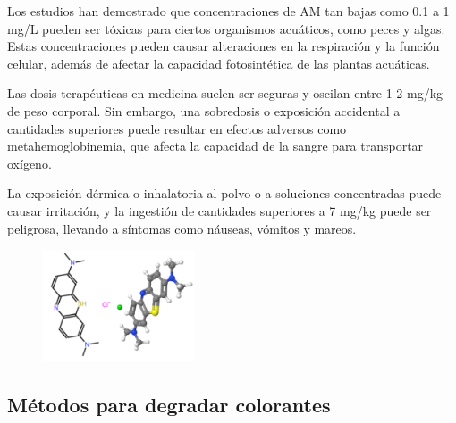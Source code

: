 \documentclass[12pt]{article}
\begin{document}
    Los estudios han demostrado que concentraciones de AM tan bajas como 0.1 a 1 mg/L pueden ser tóxicas para ciertos organismos acuáticos, como peces y algas. Estas concentraciones pueden causar alteraciones en la respiración y la función celular, además de afectar la capacidad fotosintética de las plantas acuáticas.\vspace{1em} %

     Las dosis terapéuticas en medicina suelen ser seguras y oscilan entre 1-2 mg/kg de peso corporal. Sin embargo, una sobredosis o exposición accidental a cantidades superiores puede resultar en efectos adversos como metahemoglobinemia, que afecta la capacidad de la sangre para transportar oxígeno.\vspace{1em} %


    La exposición dérmica o inhalatoria al polvo o a soluciones concentradas puede causar irritación, y la ingestión de cantidades superiores a 7 mg/kg puede ser peligrosa, llevando a síntomas como náuseas, vómitos y mareos.\vspace{1em} %

\begin{figure}[H]
    	   \begin{center}
     	  	\includegraphics[width = 0.4\textwidth]{Imagenes/BM_MOLECULA.png}
    	   \end{center} 
        \end{figure}

 \subsection{Métodos para degradar colorantes}
\end{document}
